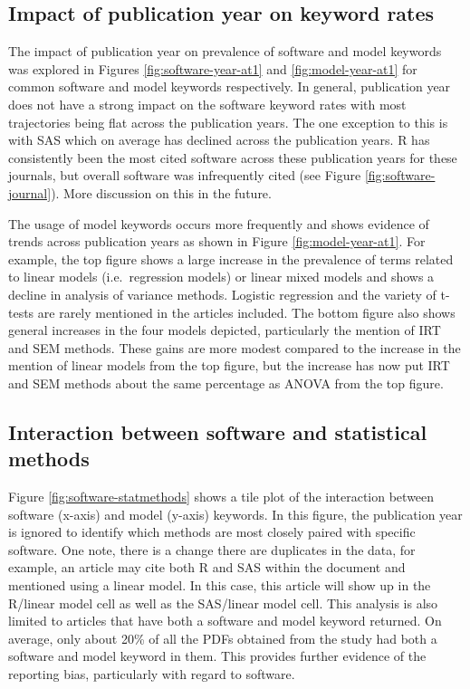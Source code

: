\documentclass[english,,man]{apa6}
\theoremstyle{definition}
\theoremstyle{definition}
\theoremstyle{definition}
\theoremstyle{remark}
\begin{document}
\hypertarget{impact-of-publication-year-on-keyword-rates}{%
\subsection{Impact of publication year on keyword
rates}\label{impact-of-publication-year-on-keyword-rates}}

The impact of publication year on prevalence of software and model
keywords was explored in Figures \ref{fig:software-year-at1} and
\ref{fig:model-year-at1} for common software and model keywords
respectively. In general, publication year does not have a strong impact
on the software keyword rates with most trajectories being flat across
the publication years. The one exception to this is with SAS which on
average has declined across the publication years. R has consistently
been the most cited software across these publication years for these
journals, but overall software was infrequently cited (see Figure
\ref{fig:software-journal}). More discussion on this in the future.

The usage of model keywords occurs more frequently and shows evidence of
trends across publication years as shown in Figure
\ref{fig:model-year-at1}. For example, the top figure shows a large
increase in the prevalence of terms related to linear models
(i.e.~regression models) or linear mixed models and shows a decline in
analysis of variance methods. Logistic regression and the variety of
t-tests are rarely mentioned in the articles included. The bottom figure
also shows general increases in the four models depicted, particularly
the mention of IRT and SEM methods. These gains are more modest compared
to the increase in the mention of linear models from the top figure, but
the increase has now put IRT and SEM methods about the same percentage
as ANOVA from the top figure.

\hypertarget{interaction-between-software-and-statistical-methods}{%
\subsection{Interaction between software and statistical
methods}\label{interaction-between-software-and-statistical-methods}}

Figure \ref{fig:software-statmethods} shows a tile plot of the
interaction between software (x-axis) and model (y-axis) keywords. In
this figure, the publication year is ignored to identify which methods
are most closely paired with specific software. One note, there is a
change there are duplicates in the data, for example, an article may
cite both R and SAS within the document and mentioned using a linear
model. In this case, this article will show up in the R/linear model
cell as well as the SAS/linear model cell. This analysis is also limited
to articles that have both a software and model keyword returned. On
average, only about 20\% of all the PDFs obtained from the study had
both a software and model keyword in them. This provides further
evidence of the reporting bias, particularly with regard to software.
\end{document}
